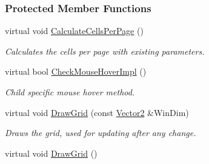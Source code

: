 \subsubsection*{Protected Member Functions}
\begin{DoxyCompactItemize}
\item 
\hypertarget{classMezzanine_1_1UI_1_1PagedCellGrid_a963656bbfd00228a235df28f50ab528b}{
virtual void \hyperlink{classMezzanine_1_1UI_1_1PagedCellGrid_a963656bbfd00228a235df28f50ab528b}{CalculateCellsPerPage} ()}
\label{classMezzanine_1_1UI_1_1PagedCellGrid_a963656bbfd00228a235df28f50ab528b}

\begin{DoxyCompactList}\small\item\em Calculates the cells per page with existing parameters. \item\end{DoxyCompactList}\item 
\hypertarget{classMezzanine_1_1UI_1_1PagedCellGrid_a6536a6e39be46f0fa0e33230b8939219}{
virtual bool \hyperlink{classMezzanine_1_1UI_1_1PagedCellGrid_a6536a6e39be46f0fa0e33230b8939219}{CheckMouseHoverImpl} ()}
\label{classMezzanine_1_1UI_1_1PagedCellGrid_a6536a6e39be46f0fa0e33230b8939219}

\begin{DoxyCompactList}\small\item\em Child specific mouse hover method. \item\end{DoxyCompactList}\item 
\hypertarget{classMezzanine_1_1UI_1_1PagedCellGrid_a329535201d348049ed163c4ac3b1b614}{
virtual void \hyperlink{classMezzanine_1_1UI_1_1PagedCellGrid_a329535201d348049ed163c4ac3b1b614}{DrawGrid} (const \hyperlink{classMezzanine_1_1Vector2}{Vector2} \&WinDim)}
\label{classMezzanine_1_1UI_1_1PagedCellGrid_a329535201d348049ed163c4ac3b1b614}

\begin{DoxyCompactList}\small\item\em Draws the grid, used for updating after any change. \item\end{DoxyCompactList}\item 
\hypertarget{classMezzanine_1_1UI_1_1PagedCellGrid_a069d11ca87a55a208cc2edf936af2190}{
virtual void \hyperlink{classMezzanine_1_1UI_1_1PagedCellGrid_a069d11ca87a55a208cc2edf936af2190}{DrawGrid} ()}
\label{classMezzanine_1_1UI_1_1PagedCellGrid_a069d11ca87a55a208cc2edf936af2190}


\end{DoxyCompactItemize}
